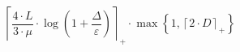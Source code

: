 \[\left\lceil \frac{4 \cdot L}{3 \cdot \mu} \cdot \log\left(1 + \frac{\Delta}{\varepsilon}\right) \right\rceil_{+} \cdot \max\left\{ 1, \left\lceil 2 \cdot D \right\rceil_{+} \right\}\]
